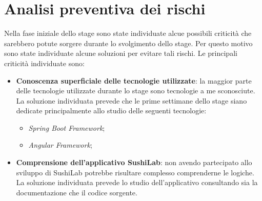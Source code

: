 \section{Analisi preventiva dei rischi}
Nella fase iniziale dello stage sono state individuate alcue possibili criticità che sarebbero potute sorgere durante lo svolgimento dello stage. Per questo motivo sono state individuate alcune soluzioni per evitare tali rischi. Le principali criticità individuate sono:
\begin{itemize}
  \item \textbf{Conoscenza superficiale delle tecnologie utilizzate}: la maggior parte delle tecnologie utilizzate durante lo stage sono tecnologie a me sconosciute. La soluzione individuata prevede che le prime settimane dello stage siano dedicate principalmente allo studio delle seguenti tecnologie:
  \begin{itemize}
    \item \textit{Spring Boot Framework};
    \item \textit{Angular Framework};
  \end{itemize}
  \item \textbf{Comprensione dell'applicativo SushiLab}: non avendo partecipato allo sviluppo di SushiLab potrebbe risultare complesso comprenderne le logiche. La soluzione individuata prevede lo studio dell'applicativo consultando sia la documentazione che il codice sorgente.
\end{itemize}
